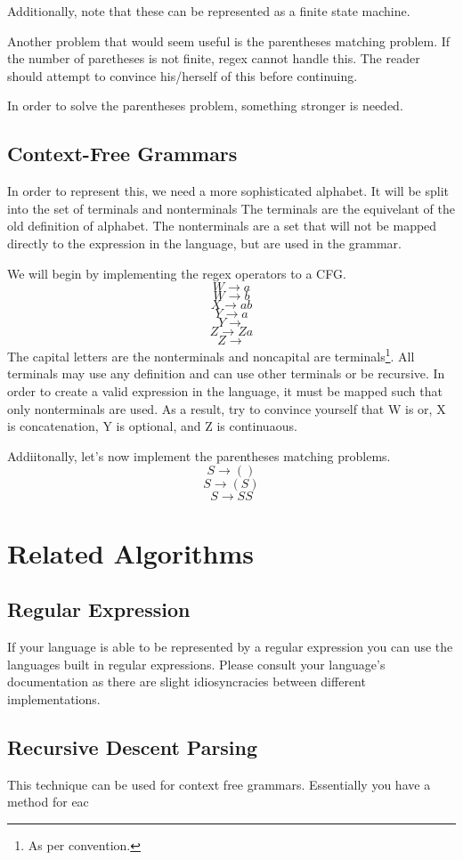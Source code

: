 Additionally, note that these can be represented as a finite state
machine.

Another problem that would seem useful is the parentheses matching
problem. If the number of paretheses is not finite, regex cannot
handle this. The reader should attempt to convince his/herself of this
before continuing.

In order to solve the parentheses problem, something stronger is
needed.

\subsection{Context-Free Grammars}

In order to represent this, we need a more sophisticated
alphabet. It will be split into the set of  terminals and nonterminals
The terminals are the equivelant of the old definition of
alphabet. The nonterminals are a set that will not be mapped directly
to the expression in the language, but are used in the grammar.

We will begin by implementing the regex operators to a CFG.
$$W \rightarrow a$$
$$W \rightarrow b$$
$$X \rightarrow ab$$
$$Y \rightarrow a$$
$$Y \rightarrow $$
$$Z \rightarrow Za$$
$$Z \rightarrow $$
The capital letters are the nonterminals and noncapital are
terminals\footnote{As per convention.}. All terminals may use any definition and can use other
terminals or be recursive. In order to create a valid expression in
the language, it must be mapped such that only nonterminals are
used. As a result, try to convince yourself that W is or, X is
concatenation, Y is optional, and Z is continuaous.

Addiitonally, let's now implement the parentheses matching problems.
$$S \rightarrow ()$$
$$S \rightarrow (S)$$
$$S \rightarrow SS$$

\section{Related Algorithms}

\subsection{Regular Expression}

If your language is able to be represented by a regular expression you
can use the languages built in regular expressions. Please consult
your language's documentation as there are slight idiosyncracies
between different implementations.

\subsection{Recursive Descent Parsing}

This technique can be used for  context free grammars. Essentially
you have a method for eac